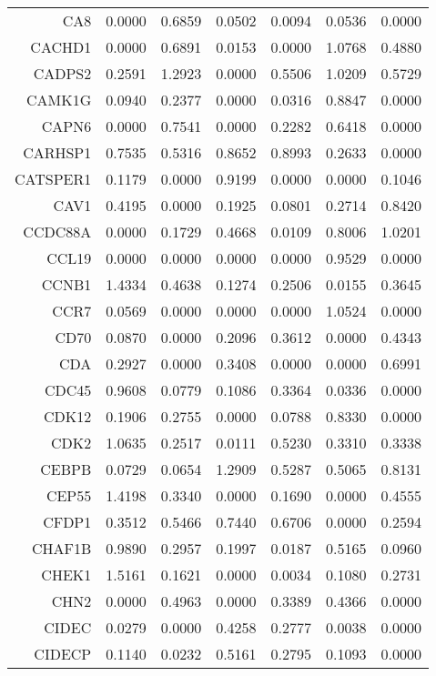 \begin{longtable}{rrrrrrr}
  CA8 & 0.0000 & 0.6859 & 0.0502 & 0.0094 & 0.0536 & 0.0000 \\ 
  CACHD1 & 0.0000 & 0.6891 & 0.0153 & 0.0000 & 1.0768 & 0.4880 \\ 
  CADPS2 & 0.2591 & 1.2923 & 0.0000 & 0.5506 & 1.0209 & 0.5729 \\ 
  CAMK1G & 0.0940 & 0.2377 & 0.0000 & 0.0316 & 0.8847 & 0.0000 \\ 
  CAPN6 & 0.0000 & 0.7541 & 0.0000 & 0.2282 & 0.6418 & 0.0000 \\ 
  CARHSP1 & 0.7535 & 0.5316 & 0.8652 & 0.8993 & 0.2633 & 0.0000 \\ 
  CATSPER1 & 0.1179 & 0.0000 & 0.9199 & 0.0000 & 0.0000 & 0.1046 \\ 
  CAV1 & 0.4195 & 0.0000 & 0.1925 & 0.0801 & 0.2714 & 0.8420 \\ 
  CCDC88A & 0.0000 & 0.1729 & 0.4668 & 0.0109 & 0.8006 & 1.0201 \\ 
  CCL19 & 0.0000 & 0.0000 & 0.0000 & 0.0000 & 0.9529 & 0.0000 \\ 
  CCNB1 & 1.4334 & 0.4638 & 0.1274 & 0.2506 & 0.0155 & 0.3645 \\ 
  CCR7 & 0.0569 & 0.0000 & 0.0000 & 0.0000 & 1.0524 & 0.0000 \\ 
  CD70 & 0.0870 & 0.0000 & 0.2096 & 0.3612 & 0.0000 & 0.4343 \\ 
  CDA & 0.2927 & 0.0000 & 0.3408 & 0.0000 & 0.0000 & 0.6991 \\ 
  CDC45 & 0.9608 & 0.0779 & 0.1086 & 0.3364 & 0.0336 & 0.0000 \\ 
  CDK12 & 0.1906 & 0.2755 & 0.0000 & 0.0788 & 0.8330 & 0.0000 \\ 
  CDK2 & 1.0635 & 0.2517 & 0.0111 & 0.5230 & 0.3310 & 0.3338 \\ 
  CEBPB & 0.0729 & 0.0654 & 1.2909 & 0.5287 & 0.5065 & 0.8131 \\ 
  CEP55 & 1.4198 & 0.3340 & 0.0000 & 0.1690 & 0.0000 & 0.4555 \\ 
  CFDP1 & 0.3512 & 0.5466 & 0.7440 & 0.6706 & 0.0000 & 0.2594 \\ 
  CHAF1B & 0.9890 & 0.2957 & 0.1997 & 0.0187 & 0.5165 & 0.0960 \\ 
  CHEK1 & 1.5161 & 0.1621 & 0.0000 & 0.0034 & 0.1080 & 0.2731 \\ 
  CHN2 & 0.0000 & 0.4963 & 0.0000 & 0.3389 & 0.4366 & 0.0000 \\ 
  CIDEC & 0.0279 & 0.0000 & 0.4258 & 0.2777 & 0.0038 & 0.0000 \\ 
  CIDECP & 0.1140 & 0.0232 & 0.5161 & 0.2795 & 0.1093 & 0.0000 \\ 

\end{longtable}

